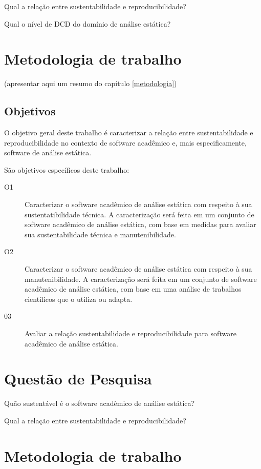 Qual a relação entre sustentabilidade e reproducibilidade?

Qual o nível de DCD do domínio de análise estática?

\section{Metodologia de trabalho}

(apresentar aqui um resumo do capítulo \ref{metodologia})

\subsection{Objetivos}

O objetivo geral deste trabalho é caracterizar a relação entre sustentabilidade
e reproducibilidade no contexto de software acadêmico e, mais especificamente,
software de análise estática. 

São objetivos específicos deste trabalho:

\begin{description}
  \item[O1] Caracterizar o software acadêmico de análise estática com respeito à sua sustentatibilidade técnica.
A caracterização será feita em um conjunto de software acadêmico de análise estática, com base em medidas para avaliar
sua sustentabilidade técnica e manutenibilidade.
  \item[O2] Caracterizar o software acadêmico de análise estática com respeito à sua manutenibilidade.
A caracterização será feita em um conjunto de software acadêmico de análise estática, com base em uma análise de trabalhos científicos que o utiliza ou adapta.
  \item[03] Avaliar a relação sustentabilidade e reproducibilidade para software acadêmico de análise estática.
\end{description}

\section{Questão de Pesquisa}

Quão sustentável é o software acadêmico de análise estática?

Qual a relação entre sustentabilidade e reproducibilidade?

\section{Metodologia de trabalho}


